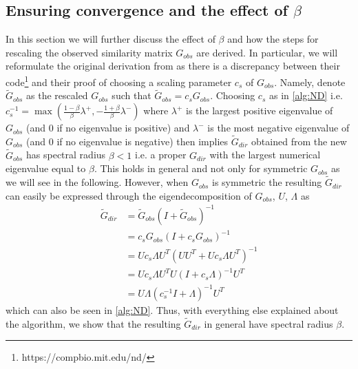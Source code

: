 \documentclass[../Thesis.tex]{subfiles}
\begin{document}
\subsection{Ensuring convergence and the effect of \texorpdfstring{$\beta$}{beta}}
In this section we will further discuss the effect of $\beta$ and how the steps for rescaling the observed similarity matrix $G_{obs}$ are derived. In particular, we will reformulate the original derivation from \cite{Network-deconvolution-as-a-general-method-to-distinguish-direct-dependencies-in-networks} as there is a discrepancy between their code\footnote{https://compbio.mit.edu/nd/} and their proof of choosing a scaling parameter $c_s$ of $G_{obs}$. Namely, denote $\tilde{G}_{obs}$ as the rescaled $G_{obs}$ such that $\tilde{G}_{obs} = c_s G_{obs}$. Choosing $c_s$ as in \autoref{alg:ND} i.e. $c_s^{-1} = \max \left( \frac{1-\beta}{\beta} \lambda^+,  -\frac{1+\beta}{\beta} \lambda^- \right)$ where $\lambda^+$ is the largest positive eigenvalue of $G_{obs}$ (and $0$ if no eigenvalue is positive) and $\lambda^-$ is the most negative eigenvalue of $G_{obs}$ (and $0$ if no eigenvalue is negative) then implies $\tilde{G}_{dir}$ obtained from the new $\tilde{G}_{obs}$ has spectral radius $\beta < 1$ i.e. a proper $G_{dir}$ with the largest numerical eigenvalue equal to $\beta$. This holds in general and not only for symmetric $G_{obs}$ as we will see in the following. However, when $G_{obs}$ is symmetric the resulting $\tilde{G}_{dir}$ can easily be expressed through the eigendecomposition of $G_{obs}$, $U$, $\Lambda$ as
\begin{align*}
    \tilde{G}_{dir} & = \tilde{G}_{obs} \left( I + \tilde{G}_{obs}\right)^{-1}         \\
                    & = c_s G_{obs} \left( I + c_s G_{obs}\right)^{-1}                 \\
                    & = U c_s \Lambda U^T \left( U U^T + U c_s \Lambda U^T\right)^{-1} \\
                    & = U c_s \Lambda U^T U \left( I + c_s \Lambda\right)^{-1} U^T     \\
                    & = U \Lambda \left(c_s^{-1} I + \Lambda\right)^{-1}U^T
\end{align*}
which can also be seen in \autoref{alg:ND}. Thus, with everything else explained about the algorithm, we show that the resulting $\tilde{G}_{dir}$ in general have spectral radius $\beta$.
\end{document}
